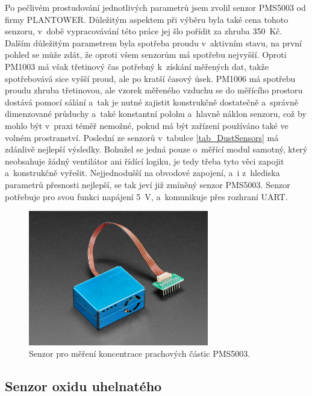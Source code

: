 Po pečlivém prostudování jednotlivých parametrů jsem zvolil senzor PMS5003 od firmy PLANTOWER. Důležitým aspektem při výběru byla také cena tohoto senzoru, v~době vypracovávání této práce jej šlo pořídit za zhruba 350~Kč. Dalším důležitým parametrem byla spotřeba proudu v~aktivním stavu, na první pohled se může zdát, že oproti všem senzorům má spotřebu nejvyšší. Oproti PM1003 má však třetinový čas potřebný k~získání měřených dat, takže spotřebovává sice vyšší proud, ale po kratší časový úsek. PM1006 má spotřebu proudu zhruba třetinovou, ale vzorek měřeného vzduchu se do měřícího prostoru dostává pomocí sálání a~tak je nutné zajistit konstrukčně dostatečně a~správně dimenzované průduchy a~také konstantní polohu a~hlavně náklon senzoru, což by mohlo být v~praxi téměř nemožné, pokud má být zařízení používáno také ve volném prostranství. Poslední ze senzorů v~tabulce \ref{tab_DustSensors} má zdánlivě nejlepší výsledky. Bohužel se jedná pouze o~měřící modul samotný, který neobsahuje žádný ventilátor ani řídící logiku, je tedy třeba tyto věci zapojit a~konstrukčně vyřešit. Nejjednodušší na obvodové zapojení, a~i z~hlediska parametrů přesnosti nejlepší, se tak jeví již zmíněný senzor PMS5003. Senzor potřebuje pro svou funkci napájení \SI{5}{\volt}, a~komunikuje přes rozhraní UART.

\begin{figure}
    \centering
    \includegraphics[width=0.7\textwidth]{obrazky/PMS5003.jpg}
    \caption{Senzor pro měření koncentrace prachových částic PMS5003. \cite{dat_PMS5003}}
    \label{fig_PMS5003}
\end{figure}

\subsection{Senzor oxidu uhelnatého}

